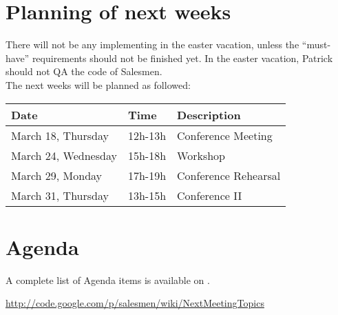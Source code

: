\documentclass[a4paper, 12pt]{article}
\begin{document}
	\section{Planning of next weeks}
There will not be any implementing in the easter vacation, unless the ``must-have'' requirements should not be finished yet. In the easter vacation, Patrick should not QA the code of Salesmen. \\
The next weeks will be planned as followed:
	
			\begin{tabular}{l | l | l }
				\textbf{Date} & \textbf{Time} & \textbf{Description} \\
				\hline
				March 18, Thursday  & 12h-13h & Conference Meeting\\
				\hline
				March 24, Wednesday & 15h-18h & Workshop\\
				\hline
				March 29, Monday    & 17h-19h & Conference Rehearsal\\
				\hline
				March 31, Thursday  & 13h-15h & Conference II\\

			\end{tabular}

		\section{Agenda}
A complete list of Agenda items is available on \cite{agendaitems}.\\
	
	\begin{thebibliography}{99}
		
		
		\href{http://code.google.com/p/salesmen/wiki/NextMeetingTopics}{http://code.google.com/p/salesmen/wiki/NextMeetingTopics}

		
	\end{thebibliography}	
		
\end{document}
